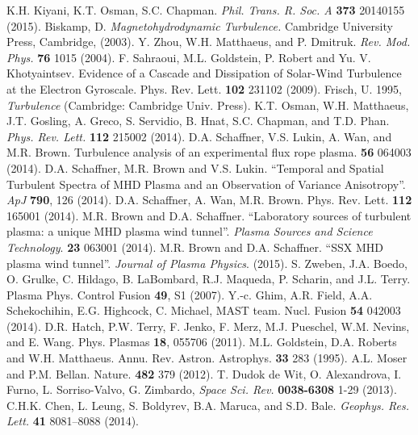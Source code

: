 \documentclass[aip,pop,amsmath,amssymb,preprint,superscriptaddress]{revtex4-1} %
\begin{document}
\providecommand{\noopsort}[1]{}\providecommand{\singleletter}[1]{#1}%
\begin{thebibliography}{10}

 K.H. Kiyani, K.T. Osman, S.C. Chapman. {\it Phil. Trans. R. Soc. A} {\bf 373} 20140155 (2015).
 Biskamp, D. {\it Magnetohydrodynamic Turbulence.} Cambridge University Press, Cambridge, (2003).
 Y. Zhou, W.H. Matthaeus, and P. Dmitruk. {\it Rev. Mod. Phys.} {\bf 76} 1015 (2004).
 F. Sahraoui, M.L. Goldstein, P. Robert and Yu. V. Khotyaintsev. Evidence of a Cascade and Dissipation of Solar-Wind Turbulence at the Electron Gyroscale. Phys. Rev. Lett. {\bf 102} 231102 (2009).
 Frisch, U. 1995, {\it Turbulence} (Cambridge: Cambridge Univ. Press).
 K.T. Osman, W.H. Matthaeus, J.T. Gosling, A. Greco, S. Servidio, B. Hnat, S.C. Chapman, and T.D. Phan. {\it Phys. Rev. Lett.} {\bf 112} 215002 (2014).
 D.A. Schaffner, V.S. Lukin, A. Wan, and M.R. Brown. Turbulence analysis of an experimental flux rope plasma. {\bf 56} 064003 (2014).
 D.A. Schaffner, M.R. Brown and V.S. Lukin. ``Temporal and Spatial Turbulent Spectra of MHD Plasma and an Observation of Variance Anisotropy''. {\it ApJ} {\bf 790}, 126 (2014).
 D.A. Schaffner, A. Wan, M.R. Brown. Phys. Rev. Lett. {\bf 112} 165001 (2014).
 M.R. Brown and D.A. Schaffner. ``Laboratory sources of turbulent plasma: a unique MHD plasma wind tunnel''. {\it Plasma Sources and Science Technology}. {\bf 23} 063001 (2014).
 M.R. Brown and D.A. Schaffner. ``SSX MHD plasma wind tunnel''. {\it Journal of Plasma Physics}. (2015).
 S. Zweben, J.A. Boedo, O. Grulke, C. Hildago, B. LaBombard, R.J. Maqueda, P. Scharin, and J.L. Terry. Plasma Phys. Control Fusion {\bf 49}, S1 (2007).
 Y.-c. Ghim, A.R. Field, A.A. Schekochihin, E.G. Highcock, C. Michael, MAST team. Nucl. Fusion {\bf 54} 042003 (2014).
 D.R. Hatch, P.W. Terry, F. Jenko, F. Merz, M.J. Pueschel, W.M. Nevins, and E. Wang. Phys. Plasmas {\bf 18}, 055706 (2011).
 M.L. Goldstein, D.A. Roberts and W.H. Matthaeus. Annu. Rev. Astron. Astrophys. {\bf 33} 283 (1995).
 A.L. Moser and P.M. Bellan. Nature. {\bf 482} 379 (2012).
 T. Dudok de Wit, O. Alexandrova, I. Furno, L. Sorriso-Valvo, G. Zimbardo, {\it Space Sci. Rev.} {\bf 0038-6308} 1-29 (2013).
 C.H.K. Chen, L. Leung, S. Boldyrev, B.A. Maruca, and S.D. Bale. {\it Geophys. Res. Lett.} {\bf 41} 8081–8088 (2014).

\end{thebibliography}
\end{document}
